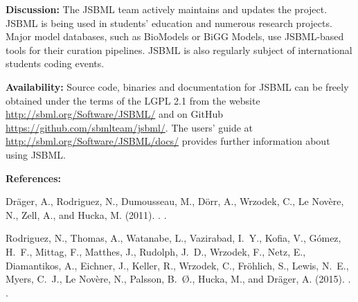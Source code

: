 \documentclass{beamer}
\begin{document}
\begin{frame}[fragile]
\begin{block}{\textbf{Discussion:}}
The JSBML team actively maintains and updates the project.
JSBML is being used in students’ education and numerous research projects.
Major model databases, such as BioModels or BiGG Models, use JSBML-based tools for their curation pipelines.
JSBML is also regularly subject of international students coding events.
\end{block}

\begin{block}{\textbf{Availability:}}
Source code, binaries and documentation for JSBML can be freely obtained under the terms of the LGPL 2.1 from the website \url{http://sbml.org/Software/JSBML/} and on GitHub \url{https://github.com/sbmlteam/jsbml/}.
The users' guide at \url{http://sbml.org/Software/JSBML/docs/} provides further information about using JSBML.
\end{block}

\begin{block}{\textbf{References:}}
\begin{thebibliography}{}
Dr\"ager, A., Rodriguez, N., Dumousseau, M., D\"orr, A., Wrzodek, C., {Le
  Nov\`{e}re}, N., Zell, A., and Hucka, M. (2011).
.
.

Rodriguez, N., Thomas, A., Watanabe, L., Vazirabad, I.~Y., Kofia, V.,
  G\'{o}mez, H.~F., Mittag, F., Matthes, J., Rudolph, J.~D., Wrzodek, F., Netz,
  E., Diamantikos, A., Eichner, J., Keller, R., Wrzodek, C., Fr\"ohlich, S.,
  Lewis, N.~E., Myers, C.~J., {Le Nov\`{e}re}, N., Palsson, B.~{\O}., Hucka,
  M., and Dr\"ager, A. (2015).
.
.

\end{thebibliography}
\end{block}


\end{frame}
\end{document}
